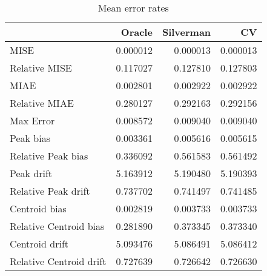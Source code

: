 \begin{table}[ht]
\centering
\begin{tabular}{lrrr}
  \hline
 & Oracle & Silverman & CV \\ 
  \hline
MISE & 0.000012 & 0.000013 & 0.000013 \\ 
  Relative MISE & 0.117027 & 0.127810 & 0.127803 \\ 
  MIAE & 0.002801 & 0.002922 & 0.002922 \\ 
  Relative MIAE & 0.280127 & 0.292163 & 0.292156 \\ 
  Max Error & 0.008572 & 0.009040 & 0.009040 \\ 
  Peak bias & 0.003361 & 0.005616 & 0.005615 \\ 
  Relative Peak bias & 0.336092 & 0.561583 & 0.561492 \\ 
  Peak drift & 5.163912 & 5.190480 & 5.190393 \\ 
  Relative Peak drift & 0.737702 & 0.741497 & 0.741485 \\ 
  Centroid bias & 0.002819 & 0.003733 & 0.003733 \\ 
  Relative Centroid bias & 0.281890 & 0.373345 & 0.373340 \\ 
  Centroid drift & 5.093476 & 5.086491 & 5.086412 \\ 
  Relative Centroid drift & 0.727639 & 0.726642 & 0.726630 \\ 
   \hline
\end{tabular}
\caption{Mean error rates} 
\label{tbl:mean_error_rates}
\end{table}
